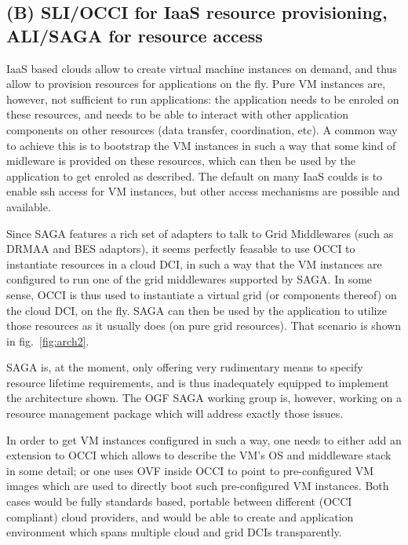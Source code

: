 \documentclass[10pt,conference,final,letterpaper,twoside,twocolumn,]{IEEEtran}
\begin{document}

\subsection{(B) SLI/OCCI for IaaS resource provisioning, ALI/SAGA for resource access}

IaaS based clouds allow to create virtual machine instances on demand,
and thus allow to provision resources for applications on the fly.
Pure VM instances are, however, not sufficient to run applications:
the application needs to be enroled on these resources, and needs to
be able to interact with other application components on other
resources (data transfer, coordination, etc).  A common way to achieve
this is to bootstrap the VM instances in such a way that some kind of
midleware is provided on these resources, which can then be used by
the application to get enroled as described.  The default on many IaaS
coulds is to enable ssh access for VM instances, but other access
mechanisms are possible and available.

Since SAGA features a rich set of adapters to talk to Grid Middlewares
(such as DRMAA and BES adaptors), it seems perfectly feasable to use
OCCI to instantiate resources in a cloud DCI, in such a way that the
VM instances are configured to run one of the grid middlewares
supported by SAGA.  In some sense, OCCI is thus used to instantiate a
virtual grid (or components thereof) on the cloud DCI, on the fly.
SAGA can then be used by the application to utilize those resources as
it usually does (on pure grid resources).  That scenario is shown in
fig.~\ref{fig:arch2}.

SAGA is, at the moment, only offering very rudimentary means to
specify resource lifetime requirements, and is thus inadequately
equipped to implement the architecture shown.  The OGF SAGA working
group is, however, working on a resource management package which will
address exactly those issues.

In order to get VM instances configured in such a way, one needs to
either add an extension to OCCI which allows to describe the VM's OS
and middleware stack in some detail; or one uses OVF inside OCCI to
point to pre-configured VM images which are used to directly boot such
pre-configured VM instances.  Both cases would be fully standards
based, portable between different (OCCI compliant) cloud providers,
and would be able to create and application environment which spans
multiple cloud and grid DCIs transparently.
\end{document}
